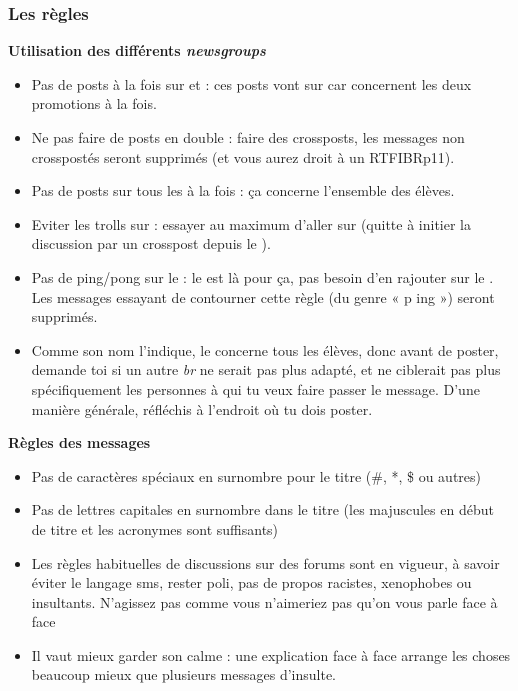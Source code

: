 \subsubsection{Les règles}
\textbf{Utilisation des différents \emph{newsgroups}}
\begin{itemize}

 \item Pas de posts à la fois sur  et  : ces posts vont sur  car concernent les deux promotions à la fois.
 \item Ne pas faire de posts en double : faire des crossposts, les messages non crosspostés seront supprimés (et vous aurez droit à un RTFIBRp11).
 \item Pas de posts sur tous les  à la fois : ça concerne l'ensemble des élèves.
 \item Eviter les trolls sur  : essayer au maximum d'aller sur  (quitte à initier la discussion par un crosspost depuis le ).
 \item Pas de ping/pong sur le  : le  est là pour ça, pas besoin d'en rajouter sur le . Les messages essayant de contourner cette règle (du genre « p ing ») seront supprimés.
 \item Comme son nom l'indique, le  concerne tous les élèves, donc avant de poster, demande toi si un autre \emph{br} ne serait pas plus adapté, et ne ciblerait pas plus spécifiquement les personnes à qui tu veux faire passer le message. D'une manière générale, réfléchis à l'endroit où tu dois poster.

\end{itemize}

\textbf{Règles des messages}
\begin{itemize}
 \item Pas de caractères spéciaux en surnombre pour le titre (\#, *, \$ ou autres)
 \item Pas de lettres capitales en surnombre dans le titre (les majuscules en début de titre et les acronymes sont suffisants)
 \item Les règles habituelles de discussions sur des forums sont en vigueur, à savoir éviter le langage sms, rester poli, pas de propos racistes, xenophobes ou insultants. N'agissez pas comme vous n'aimeriez pas qu'on vous parle face à face
 \item Il vaut mieux garder son calme : une explication face à face arrange les choses beaucoup mieux que plusieurs messages d'insulte.
\end{itemize}

